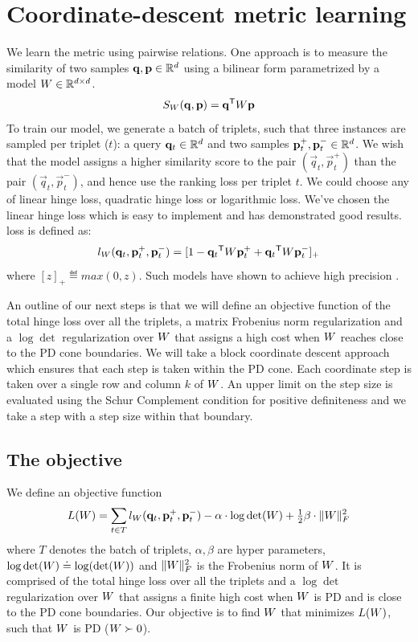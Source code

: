 \documentclass{article}
\begin{document}
\section{Coordinate-descent metric learning}
We learn the metric using pairwise relations. One approach is to measure the similarity of two samples $\mathbf{q}, \mathbf{p} \in \mathbb{R}^d$ using a bilinear form parametrized by a model ${W} \in \mathbb{R}^{d \times d}$.
\begin{equation}
S_{{W}}(\mathbf{q}, \mathbf{p}) = \mathbf{q}{}^\mathsf{T} {W} \mathbf{p}
\end{equation}
To train our model, we generate a batch of triplets, such that three instances are sampled per triplet ($t$): a query $\mathbf{q}_t \in \mathbb{R}^d$ and two samples $\mathbf{p}_{t}^{+}, \mathbf{p}_{t}^{-} \in \mathbb{R}^d$. We wish that the model assigns a higher similarity score to the pair $(\vec{q}_t, \vec{p}_{t}^{+})$ than the pair $(\vec{q}_t, \vec{p}_{t}^{-})$, and hence use the ranking loss per triplet $t$. We could choose any of linear hinge loss, quadratic hinge loss or logarithmic loss. We've chosen the linear hinge loss which is easy to implement and has demonstrated good results.  loss is defined as:
\begin{equation}
l_{{W}}(\mathbf{q}_t, \mathbf{p}_{t}^{+}, \mathbf{p}_{t}^{-})=[1-\mathbf{q}_{t}{}^\mathsf{T} {W} \mathbf{p}_{t}^{+}+\mathbf{q}_{t}{}^\mathsf{T}{W}\mathbf{p}_{t}^{-}]_{+}
\label{hingelt}
\end{equation}
where $[z]_{+} \eqdef max(0,z)$. Such models have shown to achieve high precision \cite{oasis, qian}.

An outline of our next steps is that we will define an objective function of the total hinge loss over all the triplets, a matrix Frobenius norm regularization and a $\log \det$ regularization over ${W}$ that assigns a high cost when ${W}$ reaches close to the PD cone boundaries. 
We will take a block coordinate descent approach which ensures that each step is taken within the PD cone. Each coordinate step is taken over a single row and column $k$ of ${W}$. An upper limit on the step size is  evaluated using the Schur Complement condition for positive definiteness  and we take a step with a step size within that boundary. 

\subsection{The objective}
We define an objective function
\begin{equation}
L({W})=\sum\limits_{t\in T}{l_{{W}}(\mathbf{q}_t, \mathbf{p}_{t}^{+}, \mathbf{p}_{t}^{-})} - \alpha \cdot \log \det({W}) + \tfrac{1}{2} \beta \cdot \| {W} \|_{F}^{2} 
\end{equation}
where $T$ denotes the batch of triplets, $\alpha, \beta$ are hyper parameters,  $\log \det({W}) \doteq \log (\det({W}))$ and $\| {W} \|_{F}^{2}$ is the Frobenius norm of ${W}$. It is comprised of the total hinge loss over all the triplets and a $\log \det$ regularization over ${W}$ that assigns a finite high cost when ${W}$ is PD and is close to the PD cone boundaries. 
Our objective is to find ${W}$ that minimizes $L({W})$, such that ${W}$ is PD (${W}\succ 0$).
\end{document}
